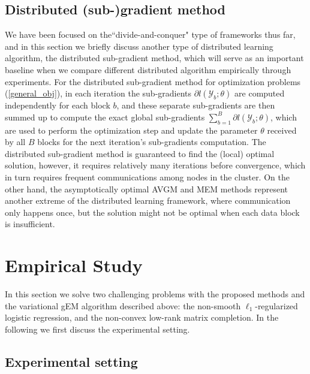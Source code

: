 \documentclass{article}
\newcommand{\1}[0]{\ensuremath{\boldsymbol{1}}\xspace}
\begin{document}
\subsection{Distributed (sub-)gradient method}
We have been focused on the``divide-and-conquer" type of frameworks thus far, and in this section we briefly discuss another type of distributed learning algorithm, the distributed sub-gradient method, which will serve as an important baseline when we compare different distributed algorithm empirically through experiments. For the distributed sub-gradient method for optimization problems (\ref{general_obj}), in each iteration the sub-gradients $\partial l(\mathcal{Y}_b; \theta)$ are computed independently for each block $b$, and these separate sub-gradients are then summed up to compute the exact global sub-gradients $\textstyle\sum_{b=1}^B\partial l(\mathcal{Y}_b; \theta)$, which are used to perform the optimization step and update the parameter $\theta$ received by all $B$ blocks for the next iteration's sub-gradients computation. The distributed sub-gradient method is guaranteed to find the (local) optimal solution, however, it requires relatively many iterations before convergence, which in turn requires frequent communications among nodes in the cluster. On the other hand, the asymptotically optimal AVGM and MEM methods represent another extreme of the distributed learning framework, where communication only happens once, but the solution might not be optimal when each data block is insufficient.

\section{Empirical Study}
In this section we solve two challenging problems with the proposed methods and the variational gEM algorithm described above: the non-smooth $\ell_1$-regularized logistic regression, and the non-convex low-rank matrix completion. In the following we first discuss the experimental setting.

\subsection{Experimental setting}
\end{document}
